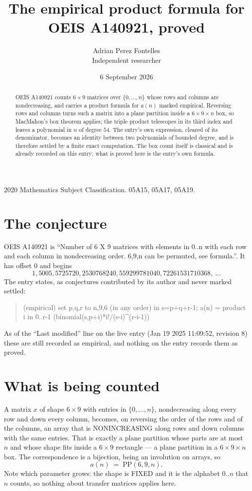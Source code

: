 \documentclass[11pt,a4paper]{article}
\title{The empirical product formula for OEIS A140921, proved}
\author{Adrian Perez Fontelles\\ \small Independent researcher}
\date{6 September 2026}
\theoremstyle{plain}
\theoremstyle{definition}
\begin{document}
\maketitle

\begin{abstract}
OEIS A140921 counts $6\times9$ matrices over $\{0,\dots,n\}$ whose rows and columns are
nondecreasing, and carries a product formula for $a(n)$ marked empirical. Reversing rows and
columns turns such a matrix into a plane partition inside a $6\times9\times n$ box, so
MacMahon's box theorem applies; the triple product telescopes in its third index and leaves a
polynomial in $n$ of degree $54$. The entry's own expression, cleared of its denominator,
becomes an identity between two polynomials of bounded degree, and is therefore settled by a
finite exact computation. The box count itself is classical and is already recorded on this
entry; what is proved here is the entry's own formula.
\end{abstract}

\noindent\small 2020 Mathematics Subject Classification. 05A15, 05A17, 05A19.\normalsize

\section{The conjecture}

OEIS A140921 is ``Number of 6 X 9 matrices with elements in 0..n with each row and each column in nondecreasing order. 6,9,n can be permuted, see formula.''. It has offset $0$ and begins
\[
1, 5005, 5725720, 2530768240, 559299781040, 72261531710368,\ \dots
\]
The entry states, as conjectures contributed by its author and never marked settled:
\begin{quote}
(empirical) set p,q,r to n,9,6 (in any order) in s=p+q+r-1; a(n) = product {i in 0..r-1} (binomial(s,p+i)*i!/(s-i)\^{}(r-i-1))

\end{quote}
As of the ``Last modified'' line on the live entry (Jan 19 2025 11:09:52, revision 8) these are still
recorded as empirical, and nothing on the entry records them as proved.

\section{What is being counted}

A matrix $x$ of shape $6\times9$ with entries in $\{0,\dots,n\}$, nondecreasing along
every row and down every column, becomes, on reversing the order of the rows and of the
columns, an array that is NONINCREASING along rows and down columns with the same entries. That
is exactly a plane partition whose parts are at most $n$ and whose shape fits inside a
$6\times9$ rectangle --- a plane partition in a $6\times9\times n$ box. The
correspondence is a bijection, being an involution on arrays, so
\[
a(n)\;=\;\mathrm{PP}(6,9,n).
\]
Note which parameter grows: the shape is FIXED and it is the alphabet $0..n$ that $n$ counts,
so nothing about transfer matrices applies here.
\end{document}
